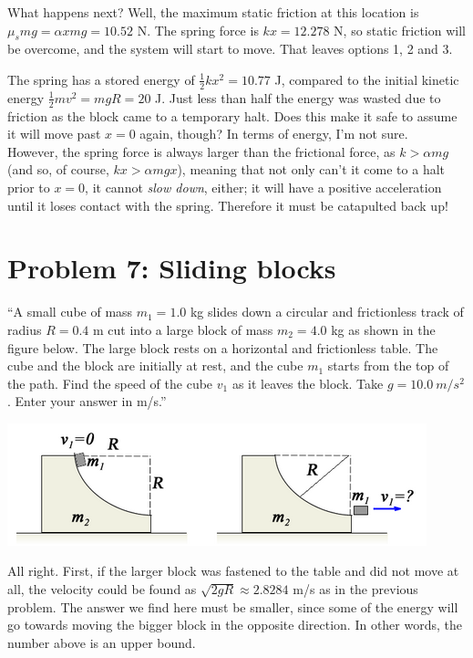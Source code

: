 \documentclass[8.01x]{subfiles}
\begin{document}
What happens next? Well, the maximum static friction at this location is $\mu_s m g = \alpha x m g = 10.52$ N. The spring force is $k x = 12.278$ N, so static friction will be overcome, and the system will start to move. That leaves options 1, 2 and 3.

The spring has a stored energy of $\frac{1}{2} k x^2 = 10.77$ J, compared to the initial kinetic energy $\frac{1}{2} m v^2 = m g R = 20$ J. Just less than half the energy was wasted due to friction as the block came to a temporary halt. Does this make it safe to assume it will move past $x = 0$ again, though? In terms of energy, I'm not sure.\\
However, the spring force is always larger than the frictional force, as $k > \alpha m g$ (and so, of course, $k x > \alpha m g x$), meaning that not only can't it come to a halt prior to $x = 0$, it cannot \emph{slow down}, either; it will have a positive acceleration until it loses contact with the spring. Therefore it must be catapulted back up!

\section{Problem 7: Sliding blocks}

``A small cube of mass $m_1 = 1.0$ kg slides down a circular and frictionless track of radius $R = 0.4$ m cut into a large block of mass $m_2 = 4.0$ kg as shown in the figure below. The large block rests on a horizontal and frictionless table. The cube and the block are initially at rest, and the cube $m_1$ starts from the top of the path. Find the speed of the cube $v_1$ as it leaves the block. Take $g = \SI{10.0}{m/s^2}$. Enter your answer in m/s.''

\begin{center}
\includegraphics[scale=0.75]{Graphics/finalexam_p7}
\end{center}

All right. First, if the larger block was fastened to the table and did not move at all, the velocity could be found as $\sqrt{2 g R} \approx 2.8284$ m/s as in the previous problem. The answer we find here must be smaller, since some of the energy will go towards moving the bigger block in the opposite direction. In other words, the number above is an upper bound.
\end{document}

